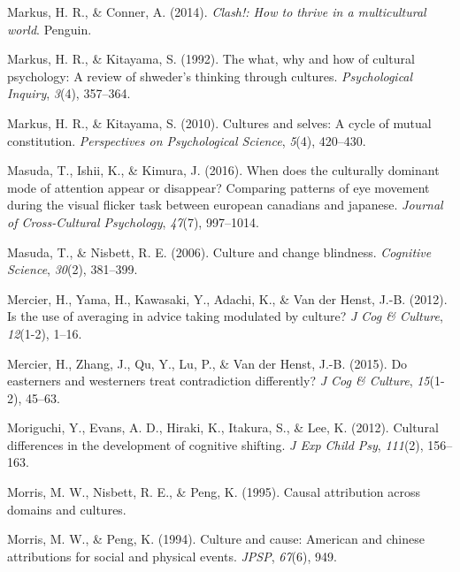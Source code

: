 \documentclass[
  man,floatsintext]{apa6}
\newlength{\cslhangindent}
\newlength{\cslentryspacingunit} %
\newenvironment{CSLReferences}[2] %
 {%
  \setlength{\parindent}{0pt}
  \ifodd #1
  \let\oldpar\par
  \def\par{\hangindent=\cslhangindent\oldpar}
  \fi
  \setlength{\parskip}{#2\cslentryspacingunit}
 }%
 {}
\begin{document}
\begin{CSLReferences}{1}{0}
\leavevmode{}%
Markus, H. R., \& Conner, A. (2014). \emph{Clash!: How to thrive in a multicultural world}. Penguin.

\leavevmode{}%
Markus, H. R., \& Kitayama, S. (1992). The what, why and how of cultural psychology: A review of shweder's thinking through cultures. \emph{Psychological Inquiry}, \emph{3}(4), 357--364.

\leavevmode{}%
Markus, H. R., \& Kitayama, S. (2010). Cultures and selves: A cycle of mutual constitution. \emph{Perspectives on Psychological Science}, \emph{5}(4), 420--430.

\leavevmode{}%
Masuda, T., Ishii, K., \& Kimura, J. (2016). When does the culturally dominant mode of attention appear or disappear? Comparing patterns of eye movement during the visual flicker task between european canadians and japanese. \emph{Journal of Cross-Cultural Psychology}, \emph{47}(7), 997--1014.

\leavevmode{}%
Masuda, T., \& Nisbett, R. E. (2006). Culture and change blindness. \emph{Cognitive Science}, \emph{30}(2), 381--399.

\leavevmode{}%
Mercier, H., Yama, H., Kawasaki, Y., Adachi, K., \& Van der Henst, J.-B. (2012). Is the use of averaging in advice taking modulated by culture? \emph{J Cog \& Culture}, \emph{12}(1-2), 1--16.

\leavevmode{}%
Mercier, H., Zhang, J., Qu, Y., Lu, P., \& Van der Henst, J.-B. (2015). Do easterners and westerners treat contradiction differently? \emph{J Cog \& Culture}, \emph{15}(1-2), 45--63.

\leavevmode{}%
Moriguchi, Y., Evans, A. D., Hiraki, K., Itakura, S., \& Lee, K. (2012). Cultural differences in the development of cognitive shifting. \emph{J Exp Child Psy}, \emph{111}(2), 156--163.

\leavevmode{}%
Morris, M. W., Nisbett, R. E., \& Peng, K. (1995). Causal attribution across domains and cultures.

\leavevmode{}%
Morris, M. W., \& Peng, K. (1994). Culture and cause: American and chinese attributions for social and physical events. \emph{JPSP}, \emph{67}(6), 949.


\end{CSLReferences}
\end{document}
